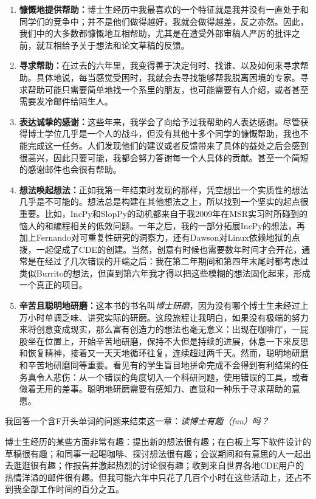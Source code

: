 \documentclass[letter,12pt]{book}
\newcommand{\bookname}{博士研磨}
\begin{document}
\begin{CJK}{UTF8}{gbsn}
\begin{enumerate}
  \item \textbf{慷慨地提供帮助：}博士生经历中我最喜欢的一个特征就是我并没有一直处于和同学们的竞争中；并不是他们做得越好，我就会做得越差，反之亦然。因此，我们中的大多数都慷慨地互相帮助，尤其是在遭受外部审稿人严厉的批评之前，就互相给予关于想法和论文草稿的反馈。
  \item \textbf{寻求帮助：}在过去的六年里，我变得善于决定何时、找谁、以及如何来寻求帮助。具体地说，每当感觉受困时，我就会去寻找能够帮我脱离困境的专家。寻求帮助可能只需要简单地找一个系里的朋友，也可能需要有人介绍，或者甚至需要发冷邮件给陌生人。
  \item \textbf{表达诚挚的感谢：}这些年来，我学会了向给予过我帮助的人表达感谢。尽管获得博士学位几乎是一个人的战斗，但没有其他十多个同学的慷慨帮助，我也不能完成这一任务。人们发现他们的建议或者反馈带来了具体的益处之后会感到很高兴，因此只要可能，我都会努力答谢每一个人具体的贡献。甚至一个简短的感谢邮件也会很有帮助。
  \item \textbf{想法唤起想法：}正如我第一年结束时发现的那样，凭空想出一个实质性的想法几乎是不可能的。想法总是构建在其他想法之上，所以找到一个坚实的起点很重要。比如，IncPy和SlopPy的动机都来自于我2009年在MSR实习时所碰到的恼人的和编程相关的低效问题。一年之后，我的一部分拓展IncPy的想法，再加上Fernando对可重复性研究的洞察力，还有Dawson对Linux依赖地狱的点拨，一起促成了CDE的创建。当然，创意有时候也需要数年时间才会开花，通常是在经过了几次错误的开端之后：我在第二年期间和第四年末尾时都考虑过类似Burrito的想法，但直到第六年我才得以把这些模糊的想法固化起来，形成一个真正的项目。
  \item \textbf{辛苦且聪明地研磨：}这本书的书名叫\emph{\bookname}，因为没有哪个博士生未经过上万小时单调乏味、讲究实际的研磨。这段旅程让我明白，如果没有极端的努力来将创意变成现实，那么富有创造力的想法也毫无意义：出现在咖啡厅，一屁股坐在位置上，开始辛苦地研磨，保持不大但是持续的进展，休息一下来反思和恢复精神，接着又一天天地循环往复，连续超过两千天。然而，聪明地研磨和辛苦地研磨同等重要。看见有的学生盲目地拼命完成不会得到有利结果的任务真令人悲伤：从一个错误的角度切入一个科研问题，使用错误的工具，或者做着无用的差事。聪明地研磨需要有感知力、直觉和一种乐于寻求帮助的意愿。
\end{enumerate}

\breakline

我回答一个含F开头单词的问题来结束这一章：\emph{读博士有趣（fun）吗？}

博士生经历的某些方面非常有趣：提出新的想法很有趣；在白板上写下软件设计的草稿很有趣；和同事一起喝咖啡、探讨想法很有趣；会议期间和有意思的人一起出去逛逛很有趣；作报告并激起热烈的讨论很有趣；收到来自世界各地CDE用户的热情洋溢的邮件很有趣。但我可能六年中只花了几百个小时在这些活动上，还占不到我全部工作时间的百分之五。


\end{CJK}
\end{document}
